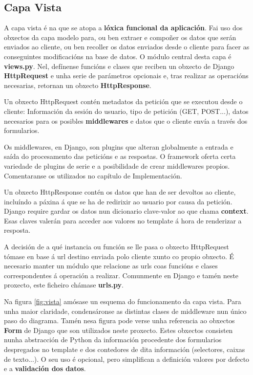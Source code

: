 \subsection{Capa Vista}

A capa vista é na que se atopa a \textbf{lóxica funcional da aplicación}. Fai uso dos obxectos da capa modelo para, ou ben extraer e compoñer os datos que serán enviados ao cliente, ou ben recoller os datos enviados desde o cliente para facer as conseguintes modificacións na base de datos. O módulo central desta capa é \textbf{views.py}. Nel, defínense funcións e clases que reciben un obxecto de Django \textbf{HttpRequest} e unha serie de parámetros opcionais e, tras realizar as operacións necesarias, retornan un obxecto \textbf{HttpResponse}.

Un obxecto HttpRequest contén metadatos da petición que se executou desde o cliente: Información da sesión do usuario, tipo de petición (GET, POST...), datos necesarios para os posibles \textbf{middlewares} e datos que o cliente envía a través dos formularios. 

Os middlewares, en Django, son plugins que alteran globalmente a entrada e saída do procesamento das peticións e as respostas. O framework oferta certa variedade de plugins de serie e a posibilidade de crear middlewares propios. Comentaranse os utilizados no capítulo de Implementación.

Un obxecto HttpResponse contén os datos que han de ser devoltos ao cliente, incluíndo a páxina á que se ha de redirixir ao usuario por causa da petición. Django require gardar os datos nun dicionario clave-valor ao que chama \textbf{context}. Esas claves valerán para acceder aos valores no template á hora de renderizar a resposta.

A decisión de a qué instancia ou función se lle pasa o obxecto HttpRequest tómase en base á url destino enviada polo cliente xunto co propio obxecto. É necesario manter un módulo que relacione as urls coas funcións e clases correspondentes á operación a realizar. Comunmente en Django e tamén neste proxecto, este ficheiro chámase \textbf{urls.py}.

Na figura \ref{fig:vista} amósase un esquema do funcionamento da capa vista. Para unha maior claridade, condensáronse as distintas clases de middleware nun único paso do diagrama. Tamén nesa figura pode verse unha referencia ao obxectos \textbf{Form} de Django que son utilizados neste proxecto. Estes obxectos consisten nunha abstracción de Python da información procedente dos formularios despregados no template e dos contedores de dita información (selectores, caixas de texto...). O seu uso é opcional, pero simplifican a definición valores por defecto e a \textbf{validación dos datos}.

